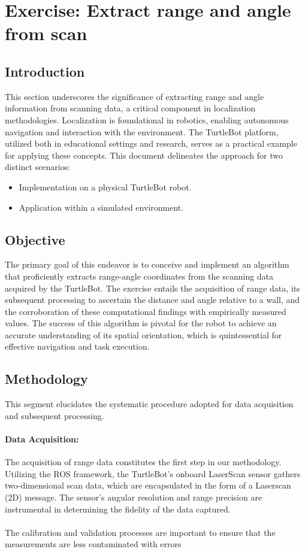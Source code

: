 \documentclass[12pt,a4paper]{article}
\begin{document}
	
	\clearpage
	\section{Exercise: Extract range and angle from scan}
	\subsection{Introduction}
	This section underscores the significance of extracting range and angle information from scanning data, a critical component in localization methodologies. Localization is foundational in robotics, enabling autonomous navigation and interaction with the environment. The TurtleBot platform, utilized both in educational settings and research, serves as a practical example for applying these concepts. This document delineates the approach for two distinct scenarios:
	\begin{itemize}
		\item Implementation on a physical TurtleBot robot.
		\item Application within a simulated environment.
	\end{itemize}
	
	\subsection{Objective}
	The primary goal of this endeavor is to conceive and implement an algorithm that proficiently extracts range-angle coordinates from the scanning data acquired by the TurtleBot. The exercise entails the acquisition of range data, its subsequent processing to ascertain the distance and angle relative to a wall, and the corroboration of these computational findings with empirically measured values. The success of this algorithm is pivotal for the robot to achieve an accurate understanding of its spatial orientation, which is quintessential for effective navigation and task execution.
	
	
	\subsection{Methodology}
	This segment elucidates the systematic procedure adopted for data acquisition and subsequent processing.
	
	\paragraph{Data Acquisition:}
	The acquisition of range data constitutes the first step in our methodology. Utilizing the ROS framework, the TurtleBot's onboard LaserScan sensor gathers two-dimensional scan data, which are encapsulated in the form of a Laserscan (2D) message. The sensor's angular resolution and range precision are instrumental in determining the fidelity of the data captured.
	\\\\
	The calibration and validation processes are important to ensure that the measurements are less contaminated with errors
	
\end{document}

